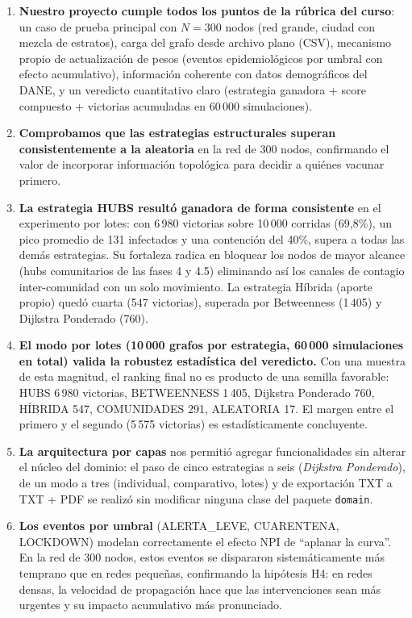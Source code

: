 \documentclass[spanish,notitlepage,letterpaper, 12pt]{article}
\begin{document}
\begin{enumerate}[leftmargin=*]
    \item \textbf{Nuestro proyecto cumple todos los puntos de la r\'ubrica del curso}: un caso de prueba principal con $N = 300$ nodos (red grande, ciudad con mezcla de estratos), carga del grafo desde archivo plano (CSV), mecanismo propio de actualizaci\'on de pesos (eventos epidemiol\'ogicos por umbral con efecto acumulativo), informaci\'on coherente con datos demogr\'aficos del DANE, y un veredicto cuantitativo claro (estrategia ganadora + score compuesto + victorias acumuladas en 60\,000 simulaciones).

    \item \textbf{Comprobamos que las estrategias estructurales superan consistentemente a la aleatoria} en la red de 300 nodos, confirmando el valor de incorporar informaci\'on topol\'ogica para decidir a qui\'enes vacunar primero.

    \item \textbf{La estrategia HUBS result\'o ganadora de forma consistente} en el experimento por lotes: con 6\,980 victorias sobre 10\,000 corridas (69{,}8\%), un pico promedio de 131 infectados y una contenci\'on del 40\%, supera a todas las dem\'as estrategias. Su fortaleza radica en bloquear los nodos de mayor alcance (hubs comunitarios de las fases 4 y 4.5) eliminando as\'i los canales de contagio inter-comunidad con un solo movimiento. La estrategia H\'ibrida (aporte propio) qued\'o cuarta (547 victorias), superada por Betweenness (1\,405) y Dijkstra Ponderado (760).

    \item \textbf{El modo por lotes (10\,000 grafos por estrategia, 60\,000 simulaciones en total) valida la robustez estad\'istica del veredicto.} Con una muestra de esta magnitud, el ranking final no es producto de una semilla favorable: HUBS 6\,980 victorias, BETWEENNESS 1\,405, Dijkstra Ponderado 760, H\'IBRIDA 547, COMUNIDADES 291, ALEATORIA 17. El margen entre el primero y el segundo (5\,575 victorias) es estad\'isticamente concluyente.

    \item \textbf{La arquitectura por capas} nos permiti\'o agregar funcionalidades sin alterar el n\'ucleo del dominio: el paso de cinco estrategias a seis (\textit{Dijkstra Ponderado}), de un modo a tres (individual, comparativo, lotes) y de exportaci\'on TXT a TXT + PDF se realiz\'o sin modificar ninguna clase del paquete \texttt{domain}.

    \item \textbf{Los eventos por umbral} (ALERTA\_LEVE, CUARENTENA, LOCKDOWN) modelan correctamente el efecto NPI de ``aplanar la curva''. En la red de 300 nodos, estos eventos se dispararon sistem\'aticamente m\'as temprano que en redes peque\~nas, confirmando la hip\'otesis H4: en redes densas, la velocidad de propagaci\'on hace que las intervenciones sean m\'as urgentes y su impacto acumulativo m\'as pronunciado.


\end{enumerate}
\end{document}

